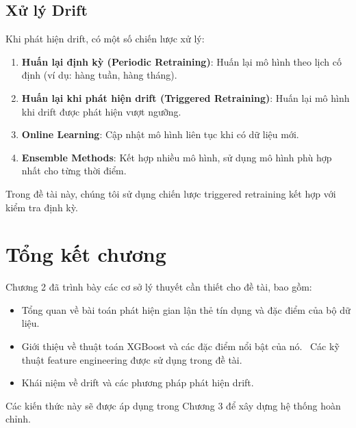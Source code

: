 \subsection{Xử lý Drift}

Khi phát hiện drift, có một số chiến lược xử lý:

\begin{enumerate}
    \item \textbf{Huấn lại định kỳ (Periodic Retraining)}: Huấn lại mô hình theo lịch cố định (ví dụ: hàng tuần, hàng tháng).
    
    \item \textbf{Huấn lại khi phát hiện drift (Triggered Retraining)}: Huấn lại mô hình khi drift được phát hiện vượt ngưỡng.
    
    \item \textbf{Online Learning}: Cập nhật mô hình liên tục khi có dữ liệu mới.
    
    \item \textbf{Ensemble Methods}: Kết hợp nhiều mô hình, sử dụng mô hình phù hợp nhất cho từng thời điểm.
\end{enumerate}

Trong đề tài này, chúng tôi sử dụng chiến lược triggered retraining kết hợp với kiểm tra định kỳ.

\section{Tổng kết chương}

Chương 2 đã trình bày các cơ sở lý thuyết cần thiết cho đề tài, bao gồm:

\begin{itemize}
    \item Tổng quan về bài toán phát hiện gian lận thẻ tín dụng và đặc điểm của bộ dữ liệu.
    \item Giới thiệu về thuật toán XGBoost và các đặc điểm nổi bật của nó.
    \ Các kỹ thuật feature engineering được sử dụng trong đề tài.
    \item Khái niệm về drift và các phương pháp phát hiện drift.
\end{itemize}

Các kiến thức này sẽ được áp dụng trong Chương 3 để xây dựng hệ thống hoàn chỉnh.